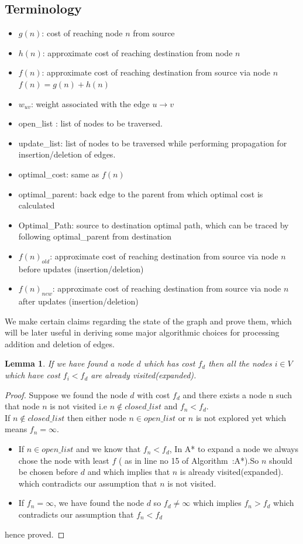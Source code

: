 \documentclass[a4paper]{article}
\newtheorem{lemma}[theorem]{Lemma}
\begin{document}
\subsection{Terminology}
\begin{itemize}
    \item $g(n)$: cost of reaching node $n$ from source
    \item $h(n)$: approximate cost of reaching destination from node $n$
    \item $f(n)$: approximate cost of reaching destination from source via node $n$ $f(n) = g(n) + h(n)$
    \item $w_{uv}$: weight associated with the edge $u \rightarrow v$
    \item open\_list : list of nodes to be traversed.
    \item update\_list: list of nodes to be traversed while performing propagation for insertion/deletion of edges.
    \item optimal\_cost: same as $f(n)$
    \item optimal\_parent: back edge to the parent from which optimal cost is calculated
    \item Optimal\_Path: source to destination optimal path, which can be traced by following optimal\_parent from destination
    \item $f(n)_{old}$: approximate cost of reaching destination from source via node $n$ before updates (insertion/deletion)
    \item $f(n)_{new}$: approximate cost of reaching destination from source via node $n$ after updates (insertion/deletion)
\end{itemize}
We make certain claims regarding the state of the graph and prove them, which will be later useful in deriving some major algorithmic choices for processing addition and deletion of edges.

\begin{lemma}\label{lemma:Astar property}
If we have found a node $d$ which has cost $f_d$ then all the nodes $i \in V$ which have cost $f_i < f_d$ are already visited(expanded).
\end{lemma}
\begin{proof}
Suppose we found the node $d$ with cost $f_d$ and there exists a node n such that node $n$ is not visited i.e $n \notin closed\_list$ and $f_n < f_d$.\\
If $n \notin closed\_list$ then either node $n \in open\_list$ or $n$ is not explored yet which means $f_n = \infty $.
\begin{itemize}[label={}]
    \item  If $n \in open\_list$  and we know that $f_n < f_d$, In A* to expand a node we always chose the node with least $f$ ( as in line no 15 of Algorithm~\cite{algo:a_star}:A*).So $n$ should be chosen before $d$ and which implies that $n$ is already visited(expanded). which contradicts our assumption that $n$ is not visited.
    \item If $f_n = \infty $, we have found the node $d$ so $f_d \neq \infty$ which implies $f_n > f_d$ which contradicts our assumption that $f_n <  f_d$
\end{itemize}
hence proved.
\end{proof}
\end{document}
